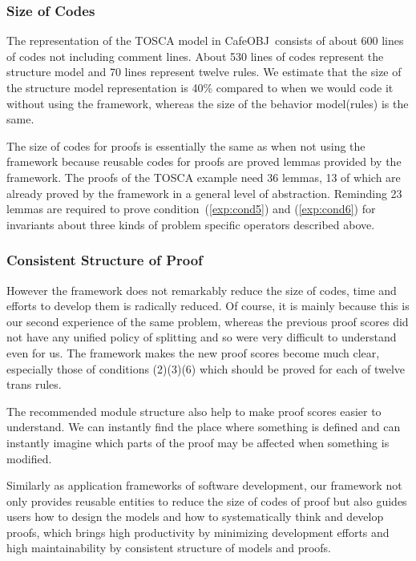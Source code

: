 \documentclass[12pt]{report}
\newcommand{\cafeobj}{{\sf CafeOBJ}~}
\begin{document}
\subsubsection{Size of Codes}
The representation of the TOSCA model in \cafeobj consists of about
600 lines of codes not including comment lines. About 530 lines of codes
represent the structure model and 70 lines represent twelve rules. We
estimate that the size of the structure model representation is 40\%
compared to when we would code it without using the framework, whereas
the size of the behavior model(rules) is the same.

The size of codes for proofs is essentially the same as when not using
the framework because reusable codes for proofs are proved lemmas
provided by the framework. The proofs of the TOSCA example need 36
lemmas, 13 of which are already proved by the framework in a general
level of abstraction. Reminding 23 lemmas are required to prove
condition~(\ref{exp:cond5}) and (\ref{exp:cond6}) for invariants about
three kinds of problem specific operators described above.

\subsubsection{Consistent Structure of Proof}
However the framework does not remarkably reduce the size of codes,
time and efforts to develop them is radically reduced. Of course, it
is mainly because this is our second experience of the same problem,
whereas the previous proof scores did not have any unified policy of
splitting and so were very difficult to understand even for us. The
framework makes the new proof scores become much clear, especially
those of conditions (2)(3)(6) which should be proved for each of
twelve trans rules.

The recommended module structure also help to make proof scores easier
to understand.  We can instantly find the place where something is
defined and can instantly imagine which parts of the proof may be
affected when something is modified.

Similarly as application frameworks of software development, our
framework not only provides reusable entities to reduce the size of
codes of proof but also guides users how to design the models and how
to systematically think and develop proofs, which brings high
productivity by minimizing development efforts and high
maintainability by consistent structure of models and proofs.

\end{document}
